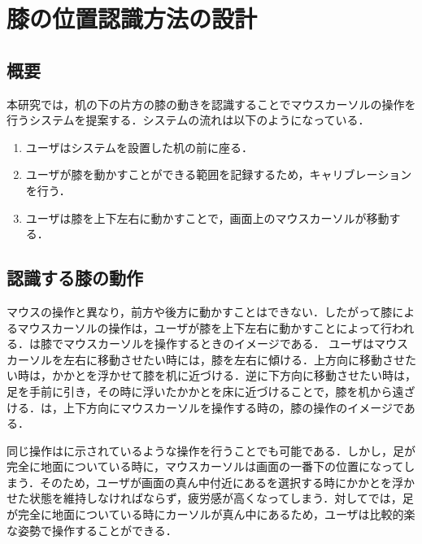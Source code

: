 \chapter{膝の位置認識方法の設計}
\section{概要}
本研究では，机の下の片方の膝の動きを認識することでマウスカーソルの操作を行うシステムを提案する．システムの流れは以下のようになっている．
\begin{enumerate}
	\item ユーザはシステムを設置した机の前に座る．
	\item ユーザが膝を動かすことができる範囲を記録するため，キャリブレーションを行う．
	\item ユーザは膝を上下左右に動かすことで，画面上のマウスカーソルが移動する．
\end{enumerate}
\section{認識する膝の動作}
マウスの操作と異なり，前方や後方に動かすことはできない．したがって膝によるマウスカーソルの操作は，ユーザが膝を上下左右に動かすことによって行われる．は膝でマウスカーソルを操作するときのイメージである．
ユーザはマウスカーソルを左右に移動させたい時には，膝を左右に傾ける．上方向に移動させたい時は，かかとを浮かせて膝を机に近づける．逆に下方向に移動させたい時は，足を手前に引き，その時に浮いたかかとを床に近づけることで，膝を机から遠ざける．は，上下方向にマウスカーソルを操作する時の，膝の操作のイメージである．

同じ操作はに示されているような操作を行うことでも可能である．しかし，足が完全に地面についている時に，マウスカーソルは画面の一番下の位置になってしまう．そのため，ユーザが画面の真ん中付近にあるを選択する時にかかとを浮かせた状態を維持しなければならず，疲労感が高くなってしまう．対してでは，足が完全に地面についている時にカーソルが真ん中にあるため，ユーザは比較的楽な姿勢で操作することができる．

